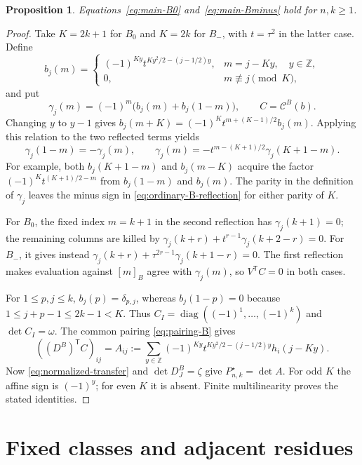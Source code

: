 \documentclass[12pt]{article}
\newtheorem{proposition}[theorem]{Proposition}
\numberwithin{equation}{section}
\newcommand{\Z}{\mathbb Z}
\newcommand{\diag}{\operatorname{diag}}
\begin{document}
\begin{proposition}
Equations~\eqref{eq:main-B0} and~\eqref{eq:main-Bminus} hold for $n,k\ge1$.
\end{proposition}

\begin{proof}
Take $K=2k+1$ for $B_0$ and $K=2k$ for $B_-$, with $t=\tau^2$
in the latter case.  Define
\[
 b_j(m)=
 \begin{cases}
 (-1)^{Ky}t^{Ky^2/2-(j-1/2)y},&m=j-Ky,\quad y\in\Z,\\
 0,&m\not\equiv j\pmod K,
 \end{cases}
\]
and put
\[
 \gamma_j(m)=(-1)^m\bigl(b_j(m)+b_j(1-m)\bigr),
 \qquad C=\mathcal C^B(b).
\]
Changing $y$ to $y-1$ gives
$b_j(m+K)=(-1)^K t^{m+(K-1)/2}b_j(m)$.
Applying this relation to the two reflected terms yields
\begin{equation}\label{eq:ordinary-B-reflection}
 \gamma_j(1-m)=-\gamma_j(m),\qquad
 \gamma_j(m)=-t^{m-(K+1)/2}\gamma_j(K+1-m).
\end{equation}
For example, both $b_j(K+1-m)$ and $b_j(m-K)$ acquire the factor
$(-1)^K t^{(K+1)/2-m}$ from $b_j(1-m)$ and $b_j(m)$.
The parity in the definition of $\gamma_j$ leaves the minus sign
in \eqref{eq:ordinary-B-reflection} for either parity of $K$.

For $B_0$, the fixed index $m=k+1$ in the second reflection has
$\gamma_j(k+1)=0$; the remaining columns are killed by
$\gamma_j(k+r)+t^{r-1}\gamma_j(k+2-r)=0$.
For $B_-$, it gives instead
$\gamma_j(k+r)+\tau^{2r-1}\gamma_j(k+1-r)=0$.
The first reflection makes evaluation against $[m]_B$ agree with
$\gamma_j(m)$, so $V^{\mathsf T}C=0$ in both cases.

For $1\le p,j\le k$, $b_j(p)=\delta_{p,j}$, whereas
$b_j(1-p)=0$ because $1\le j+p-1\le2k-1<K$.
Thus $C_I=\diag((-1)^1,\ldots,(-1)^k)$ and $\det C_I=\omega$.
The common pairing \eqref{eq:pairing-B} gives
\[
 ((D^B)^{\mathsf T}C)_{ij}
 =A_{ij}:=\sum_{y\in\Z}
 (-1)^{Ky}t^{Ky^2/2-(j-1/2)y}h_i(j-Ky).
\]
Now \eqref{eq:normalized-transfer} and $\det D^B_J=\zeta$ give
$P^\star_{n,k}=\det A$.  For odd $K$ the affine sign is $(-1)^y$;
for even $K$ it is absent.  Finite multilinearity proves the stated
identities.
\end{proof}


\section{Fixed classes and adjacent residues}\label{sec:exceptional}
\end{document}
